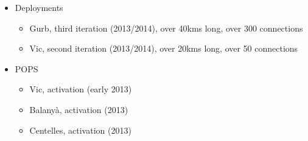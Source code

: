 \begin{itemize}
  \item Deployments
    \begin{itemize}
      \item Gurb, third iteration (2013/2014), over 40kms long, over 300 connections
    \end{itemize}
    \begin{itemize}
      \item Vic, second iteration (2013/2014), over 20kms long, over 50 connections
    \end{itemize}
  \item POPS
    \begin{itemize}
      \item Vic, activation (early 2013)
      \item Balany\`{a}, activation (2013)
      \item Centelles, activation (2013)
    \end{itemize}
\end{itemize}

